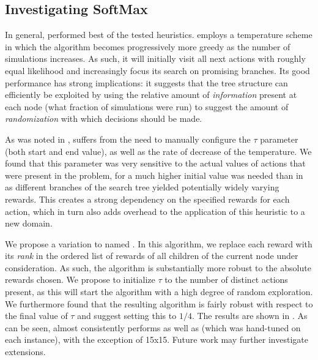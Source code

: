 \subsection{Investigating SoftMax}
In general, \soft performed best of the tested heuristics. \soft employs a temperature scheme in which the algorithm becomes progressively more greedy as the number of simulations increases. As such, it will initially visit all next actions with roughly equal likelihood and increasingly focus its search on promising branches. Its good performance has strong implications: it suggests that the tree structure can efficiently be exploited by using the relative amount of \emph{information} present at each node (what fraction of simulations were run) to suggest the amount of \emph{randomization} with which decisions should be made.


As was noted in , \soft suffers from the need to manually configure the $\tau$ parameter (both start and end value), as well as the rate of decrease of the temperature. We found that this parameter was very sensitive to the actual values of actions that were present in the problem, \eg for \poc a much higher initial value was needed than in \poc as different branches of the search tree yielded potentially widely varying rewards. This creates a strong dependency on the specified rewards for each action, which in turn also adds overhead to the application of this heuristic to a new domain.

We propose a variation to \soft named \rsoft. In this algorithm, we replace each reward with its \emph{rank} in the ordered list of rewards of all children of the current node under consideration. As such, the algorithm is substantially more robust to the absolute rewards chosen. We propose to initialize $\tau$ to the number of distinct actions present, as this will start the algorithm with a high degree of random exploration. We furthermore found that the resulting algorithm is fairly robust with respect to the final value of $\tau$ and suggest setting this to $1/4$. The results are shown in . As can be seen, \rsoft almost consistently performs as well as \soft (which was hand-tuned on each instance), with the exception of \rock 15x15. Future work may further investigate extensions.

